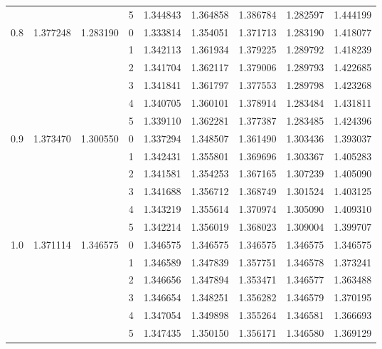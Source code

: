 \begin{tabular}{llllrrrrr}
    &          &          & 5 &  1.344843 &  1.364858 &  1.386784 &  1.282597 &  1.444199 \\
0.8 & 1.377248 & 1.283190 & 0 &  1.333814 &  1.354051 &  1.371713 &  1.283190 &  1.418077 \\
    &          &          & 1 &  1.342113 &  1.361934 &  1.379225 &  1.289792 &  1.418239 \\
    &          &          & 2 &  1.341704 &  1.362117 &  1.379006 &  1.289793 &  1.422685 \\
    &          &          & 3 &  1.341841 &  1.361797 &  1.377553 &  1.289798 &  1.423268 \\
    &          &          & 4 &  1.340705 &  1.360101 &  1.378914 &  1.283484 &  1.431811 \\
    &          &          & 5 &  1.339110 &  1.362281 &  1.377387 &  1.283485 &  1.424396 \\
0.9 & 1.373470 & 1.300550 & 0 &  1.337294 &  1.348507 &  1.361490 &  1.303436 &  1.393037 \\
    &          &          & 1 &  1.342431 &  1.355801 &  1.369696 &  1.303367 &  1.405283 \\
    &          &          & 2 &  1.341581 &  1.354253 &  1.367165 &  1.307239 &  1.405090 \\
    &          &          & 3 &  1.341688 &  1.356712 &  1.368749 &  1.301524 &  1.403125 \\
    &          &          & 4 &  1.343219 &  1.355614 &  1.370974 &  1.305090 &  1.409310 \\
    &          &          & 5 &  1.342214 &  1.356019 &  1.368023 &  1.309004 &  1.399707 \\
1.0 & 1.371114 & 1.346575 & 0 &  1.346575 &  1.346575 &  1.346575 &  1.346575 &  1.346575 \\
    &          &          & 1 &  1.346589 &  1.347839 &  1.357751 &  1.346578 &  1.373241 \\
    &          &          & 2 &  1.346656 &  1.347894 &  1.353471 &  1.346577 &  1.363488 \\
    &          &          & 3 &  1.346654 &  1.348251 &  1.356282 &  1.346579 &  1.370195 \\
    &          &          & 4 &  1.347054 &  1.349898 &  1.355264 &  1.346581 &  1.366693 \\
    &          &          & 5 &  1.347435 &  1.350150 &  1.356171 &  1.346580 &  1.369129 \\
\bottomrule
\end{tabular}

